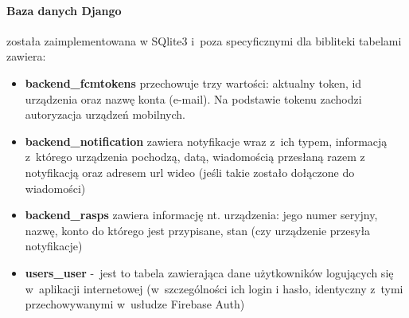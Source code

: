 \paragraph{Baza danych Django} została zaimplementowana w SQlite3 i~poza specyficznymi dla bibliteki tabelami zawiera:
\begin{itemize}
	\item \textbf{backend\_fcmtokens} przechowuje trzy wartości: aktualny token, id urządzenia oraz nazwę konta (e-mail). Na podstawie tokenu zachodzi autoryzacja urządzeń mobilnych.
	\item \textbf{backend\_notification} zawiera notyfikacje wraz z~ich typem, informacją z~którego urządzenia pochodzą, datą, wiadomością przesłaną razem z notyfikacją oraz adresem url wideo (jeśli takie zostało dołączone do wiadomości)
	\item \textbf{backend\_rasps} zawiera informację nt. urządzenia: jego numer seryjny, nazwę, konto do którego jest przypisane, stan (czy urządzenie przesyła notyfikacje)
	\item \textbf{users\_user} -~jest to tabela zawierająca dane użytkowników logujących się w~aplikacji internetowej (w~szczególności ich login i hasło, identyczny z~tymi przechowywanymi w~usłudze Firebase Auth)
\end{itemize}
